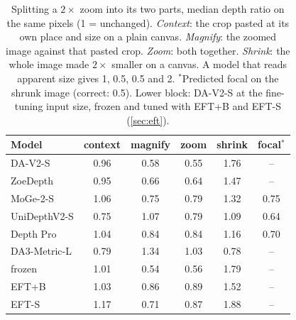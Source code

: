 \begin{table}[t]\centering\small
\caption{Splitting a $2\times$ zoom into its two parts, median depth ratio on the same pixels (1 = unchanged). \emph{Context}: the crop pasted at its own place and size on a plain canvas. \emph{Magnify}: the zoomed image against that pasted crop. \emph{Zoom}: both together. \emph{Shrink}: the whole image made $2\times$ smaller on a canvas. A model that reads apparent size gives 1, 0.5, 0.5 and 2. $^{*}$Predicted focal on the shrunk image (correct: 0.5). Lower block: DA-V2-S at the fine-tuning input size, frozen and tuned with EFT+B and EFT-S (\cref{sec:eft}).}\label{tab:cues}
\setlength{\tabcolsep}{3.5pt}
\begin{tabular}{lccccc}\toprule
Model & context & magnify & zoom & shrink & focal$^{*}$ \\ \midrule
DA-V2-S & 0.96 & 0.58 & 0.55 & 1.76 & -- \\
ZoeDepth & 0.95 & 0.66 & 0.64 & 1.47 & -- \\
MoGe-2-S & 1.06 & 0.75 & 0.79 & 1.32 & 0.75 \\
UniDepthV2-S & 0.75 & 1.07 & 0.79 & 1.09 & 0.64 \\
Depth Pro & 1.04 & 0.84 & 0.84 & 1.16 & 0.70 \\
DA3-Metric-L & 0.79 & 1.34 & 1.03 & 0.78 & -- \\
\midrule
frozen & 1.01 & 0.54 & 0.56 & 1.79 & -- \\
EFT+B & 1.03 & 0.86 & 0.89 & 1.52 & -- \\
EFT-S & 1.17 & 0.71 & 0.87 & 1.88 & -- \\
\bottomrule\end{tabular}\end{table}
